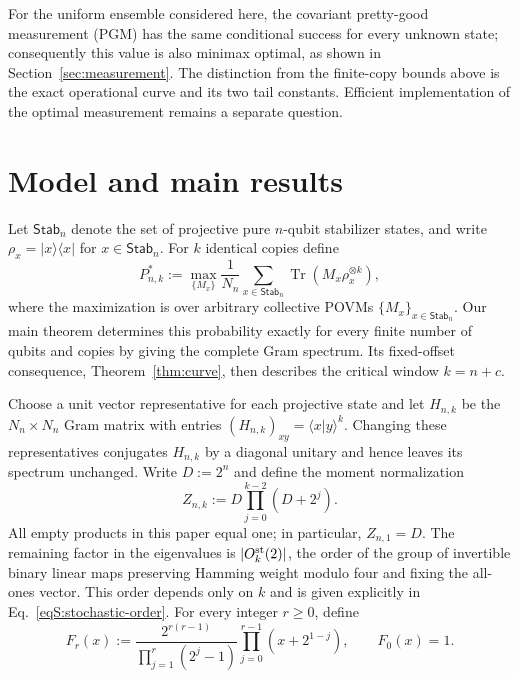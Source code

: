 \documentclass[journal,twocolumn]{IEEEtran}
\theoremstyle{definition}
\theoremstyle{plain}
\newcommand{\Stab}{\mathsf{Stab}}
\newcommand{\Tr}{\operatorname{Tr}}
\begin{document}
For the uniform ensemble considered here, the covariant pretty-good measurement (PGM)
has the same conditional success for every
unknown state; consequently this value is also minimax optimal,
as shown in Section~\ref{sec:measurement}.  The distinction from the
finite-copy bounds above is the exact operational curve and its two tail
constants.  Efficient implementation of the optimal measurement remains
a separate question.

\section{Model and main results}
\label{sec:results}
Let $\Stab_n$ denote the set of projective pure $n$-qubit stabilizer states,
and write $\rho_x=|x\rangle\!\langle x|$ for $x\in\Stab_n$.  For $k$
identical copies define
\begin{equation}
 P^*_{n,k}:=\max_{\{M_x\}}
 \frac{1}{N_n}\sum_{x\in\Stab_n}
 \Tr(M_x\rho_x^{\otimes k}),
 \label{eq:operational}
\end{equation}
where the maximization is over arbitrary collective POVMs
$\{M_x\}_{x\in\Stab_n}$.  Our main theorem determines this probability
exactly for every finite number of qubits and copies by giving the complete
Gram spectrum.  Its fixed-offset consequence, Theorem~\ref{thm:curve},
then describes the critical window $k=n+c$.

Choose a unit vector representative for each projective state and let
$H_{n,k}$ be the $N_n\times N_n$ Gram matrix with entries
$(H_{n,k})_{xy}=\langle x|y\rangle^k$.  Changing these representatives
conjugates $H_{n,k}$ by a diagonal unitary and hence leaves its spectrum
unchanged.  Write $D:=2^n$ and define the moment normalization
\begin{equation}
 Z_{n,k}:=D\prod_{j=0}^{k-2}(D+2^j).
 \label{eq:main-Z}
\end{equation}
All empty products in this paper equal one; in particular, $Z_{n,1}=D$.
The remaining factor in the eigenvalues is $|O_k^{\rm st}(2)|$, the order
of the group of invertible binary linear maps preserving Hamming weight
modulo four and fixing the all-ones vector.  This order depends only on
$k$ and is given explicitly in Eq.~\eqref{eqS:stochastic-order}.
For every integer $r\geq0$, define
\begin{equation}
 F_r(x):=\frac{2^{r(r-1)}}{\prod_{j=1}^{r}(2^j-1)}
          \prod_{j=0}^{r-1}(x+2^{1-j}),
 \qquad F_0(x)=1.
 \label{eq:Fr}
\end{equation}
\end{document}
